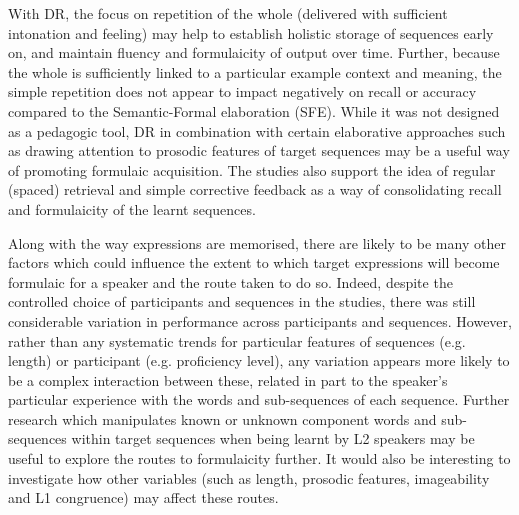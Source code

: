 \documentclass[output=paper]{langscibook}
\begin{document}
With DR, the focus on repetition of the whole (delivered with sufficient intonation and feeling) may help to establish holistic storage of sequences early on, and maintain fluency and formulaicity of output over time. Further, because the whole is sufficiently linked to a particular example context and meaning, the simple repetition does not appear to impact negatively on recall or accuracy compared to the Semantic-Formal elaboration (SFE). While it was not designed as a pedagogic tool, DR in combination with certain elaborative approaches such as drawing attention to prosodic features of target sequences \citep{BoersEtAl2012} may be a useful way of promoting formulaic acquisition. The studies also support the idea of regular (spaced) retrieval and simple corrective feedback as a way of consolidating recall and formulaicity of the learnt sequences.

Along with the way expressions are memorised, there are likely to be many other factors which could influence the extent to which target expressions will become formulaic for a speaker and the route taken to do so. Indeed, despite the controlled choice of participants and sequences in the studies, there was still considerable variation in performance across participants and sequences. However, rather than any systematic trends for particular features of sequences (e.g. length) or participant (e.g. proficiency level), any variation appears more likely to be a complex interaction between these, related in part to the speaker’s particular experience with the words and sub-sequences of each sequence. Further research which manipulates known or unknown component words and sub-sequences within target sequences when being learnt by L2 speakers may be useful to explore the routes to formulaicity further. It would also be interesting to investigate how other variables (such as length, prosodic features, imageability and L1 congruence) may affect these routes.


{\sloppy\printbibliography[heading=subbibliography,notkeyword=this]}
\end{document}
